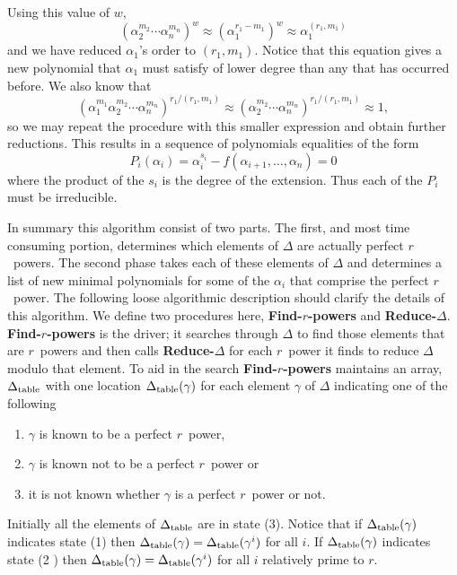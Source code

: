 Using this value of $w$,
\[
(\alpha_2^{m_2} \cdots \alpha_n^{m_n})^w \approx 
   (\alpha_1 ^{r_1 - m_1})^w \approx \alpha_1^{(r_1, m_1)}
\]
and we have reduced $\alpha_1$'s order to $(r_1, m_1)$.  Notice that this
equation  gives a new polynomial that $\alpha_1$ must satisfy of lower
degree than any  that has occurred before.  We also know that 
\[
(\alpha_1^{m_1} \alpha_2^{m_2} \cdots \alpha_n^{m_n})^{r_1/(r_1, m_1)}
  \approx (\alpha_2^{m_2} \cdots \alpha_n^{m_n})^{r_1/(r_1, m_1)}
  \approx 1,
\]
so we may repeat the procedure with this smaller expression
and obtain further reductions.  This results in a sequence of 
polynomials equalities of the form 
\[
P_i(\alpha_i) = \alpha_i^{s_i} - f(\alpha_{i+1}, \ldots, \alpha_n) = 0
\]
where the product of the $s_i$ is the degree of the extension.  Thus each
of the $P_i$ must be irreducible.

\def\dt{\mathop{\Delta_{\rm table}}}

In summary this algorithm consist of two parts.  The first, and
most time consuming portion, determines which elements of $\Delta$ are
actually perfect $r$\th\ powers.  The second phase takes each of 
these elements of $\Delta$ and determines a list of new minimal polynomials
for some of the $\alpha_i$ that comprise the perfect $r$\th\ power.
The following loose algorithmic description should clarify the details of
this algorithm.  We define two procedures here, {\bf Find-$r$\th-powers} and
{\bf Reduce-$\Delta$}.  {\bf Find-$r$\th-powers} is the driver; it searches
through $\Delta$ to find those elements that are $r$\th\ powers and then
calls {\bf Reduce-$\Delta$} for each $r$\th\ power it finds
to reduce $\Delta$ modulo that element.
To aid in the search {\bf Find-$r$\th-powers} maintains an array,
$\dt$
with one location $\dt(\gamma)$ for each element $\gamma$
of $\Delta$ indicating one of the following 

\begin{enumerate}

\item $\gamma$ is known to be a perfect $r$\th\ power, 
\item $\gamma$ is known not to be a perfect $r$\th\ power or 
\item it is not known whether $\gamma$ is a perfect $r$\th\ power or not.
\end{enumerate}

Initially all the elements of $\dt$ are in state (3).
Notice that if $\dt(\gamma)$ indicates state (1) then $\dt(\gamma) =
\dt(\gamma^i)$ for all $i$.  If $\dt(\gamma)$ indicates state (2 ) then
$\dt(\gamma) = \dt(\gamma^i)$ for all $i$ relatively prime to $r$.

